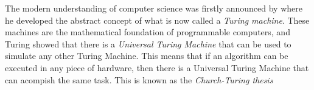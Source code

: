 \documentclass[../../dissertation.tex]{subfiles}
\begin{document}
The modern understanding of computer science was firstly announced by \cite{turing1936} where he developed the abstract concept of what is now called a \textit{Turing machine}. These machines are the mathematical foundation of programmable computers, and Turing showed that there is a \textit{Universal Turing Machine} that can be used to simulate any other Turing Machine. This means that if an algorithm can be executed in any piece of hardware, then there is a Universal Turing Machine that can acompish the same task. This is known as the \textit{Church-Turing thesis} 
\end{document}
